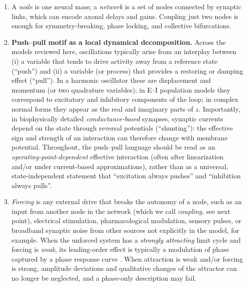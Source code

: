\documentclass[12pt]{article}
\numberwithin{equation}{section}
\newcommand{\rev}[1]{\begingroup\color{navyblue}#1\endgroup}
\begin{document}
\begin{enumerate}
\begin{enumerate}

\emph{Harmonic oscillators} are prototypical oscillatory systems,  linear and conservative models of   a mass-spring system with an angular frequency and a sinusoid whose amplitude is fixed by initial conditions \cite{Strogatz1994}. 

\emph{Limit-cycle oscillators} are nonlinear and dissipative; after transients, they settle onto a stable closed orbit.


\item 
A \emph{node} is one neural mass; a \emph{network} is a set of nodes connected by synaptic links, which can encode axonal delays and gains.  
Coupling just two nodes is enough for symmetry-breaking, phase locking, and collective bifurcations.

\item 
\rev{\textbf{Push--pull motif as a local dynamical decomposition.}
Across the models reviewed here, oscillations typically arise from an interplay between
(i) a variable that tends to drive activity away from a reference state (``push'') and
(ii) a variable (or process) that provides a restoring or damping effect (``pull'').
In a harmonic oscillator these are displacement and momentum (or two quadrature variables);
in E--I population models they correspond to excitatory and inhibitory components of the loop;
in complex normal forms they appear as the real and imaginary parts of $z$.
Importantly, in biophysically detailed \emph{conductance-based} synapses, synaptic currents
depend on the state through reversal potentials (``shunting''): the effective sign and strength
of an interaction can therefore change with membrane potential.
Throughout, the push--pull language should be read as an \emph{operating-point-dependent}
effective interaction (often after linearization and/or under current-based approximations),
rather than as a universal, state-independent statement that ``excitation always pushes'' and
``inhibition always pulls''.}


\item \emph{Forcing} is any external drive that breaks the autonomy of a node, such as an input from another node in the network (which we call \textit{coupling}, see next point),  electrical stimulation, pharmacological modulation, sensory pulses, or broadband synaptic noise from other sources not explicitly in the model, for example.  
\rev{When the unforced system has a \emph{strongly attracting} limit cycle and forcing is \emph{weak},
its leading-order effect is typically a modulation of phase captured by a phase response curve \cite{Ermentrout1991}.
When attraction is weak and/or forcing is strong, amplitude deviations and qualitative changes
of the attractor can no longer be neglected, and a phase-only description may fail.\cite{Izhikevich2007}}


\end{enumerate}
\end{enumerate}
\end{document}
